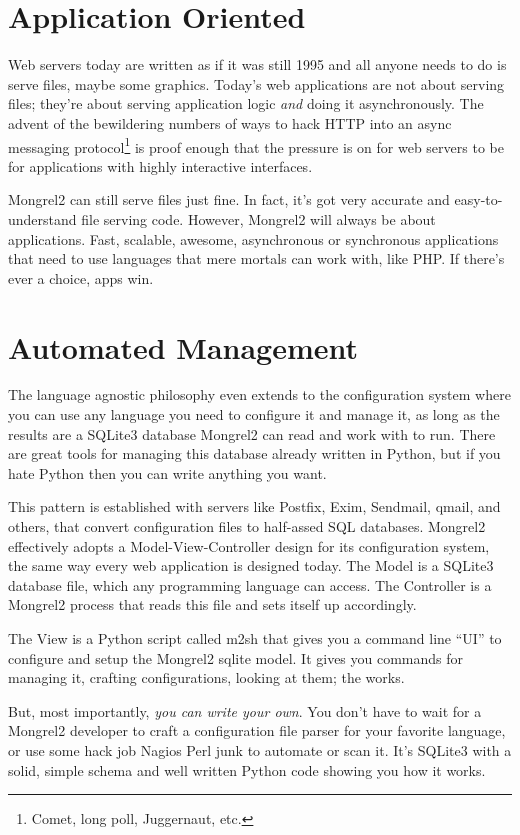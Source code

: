 \section{Application Oriented}

Web servers today are written as if it was still 1995 and all anyone needs to do
is serve files, maybe some graphics.  Today's web applications are not about serving
files; they're about serving application logic \emph{and} doing it asynchronously.
The advent of the bewildering numbers of ways to hack HTTP into an async messaging
protocol\footnote{Comet, long poll, Juggernaut, etc.} is proof enough that the
pressure is on for web servers to be for applications with highly interactive
interfaces.

Mongrel2 can still serve files just fine.  In fact, it's got very accurate and
easy-to-understand file serving code.  However, Mongrel2 will always be about applications.
Fast, scalable, awesome, asynchronous or synchronous applications that need to use languages
that mere mortals can work with, like PHP.  If there's ever a choice, apps win.

\section{Automated Management}

The language agnostic philosophy even extends to the configuration system where
you can use any language you need to configure it and manage it, as long as the
results are a SQLite3 database Mongrel2 can read and work with to run.  There are
great tools for managing this database already written in Python, but if you hate
Python then you can write anything you want.

This pattern is established with servers like Postfix, Exim, Sendmail, qmail,
and others, that convert configuration files to half-assed SQL databases.
Mongrel2 effectively adopts a Model-View-Controller design for its
configuration system, the same way every web application is designed today.
The Model is a SQLite3 database file, which any programming language can access.
The Controller is a Mongrel2 process that reads this file and sets itself up
accordingly.

The View is a Python script called m2sh that gives you a command line ``UI'' to
configure and setup the Mongrel2 sqlite model.  It gives you commands for
managing it, crafting configurations, looking at them; the works.

But, most importantly, \emph{you can write your own}.  You don't have to wait
for a Mongrel2 developer to craft a configuration file parser for your favorite
language, or use some hack job Nagios Perl junk to automate or scan it.  It's
SQLite3 with a solid, simple schema and well written Python code showing you how
it works.

